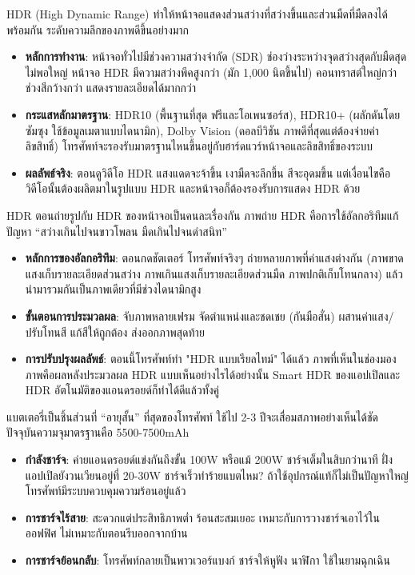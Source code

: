 
HDR (High Dynamic Range) ทำให้หน้าจอแสดงส่วนสว่างที่สว่างขึ้นและส่วนมืดที่มืดลงได้พร้อมกัน ระดับความลึกของภาพดีขึ้นอย่างมาก

\begin{itemize}
  \item \textbf{หลักการทำงาน}: หน้าจอทั่วไปมีช่วงความสว่างจำกัด (SDR) ช่องว่างระหว่างจุดสว่างสุดกับมืดสุดไม่พอใหญ่ หน้าจอ HDR มีความสว่างพีคสูงกว่า (มัก 1,000 นิตขึ้นไป) คอนทราสต์ใหญ่กว่า ช่วงสีกว้างกว่า แสดงรายละเอียดได้มากกว่า
  \item \textbf{กระแสหลักมาตรฐาน}: HDR10 (พื้นฐานที่สุด ฟรีและโอเพนซอร์ส), HDR10+ (ผลักดันโดยซัมซุง ใช้ข้อมูลเมตาแบบไดนามิก), Dolby Vision (ดอลบีวิชัน ภาพดีที่สุดแต่ต้องจ่ายค่าลิขสิทธิ์) โทรศัพท์จะรองรับมาตรฐานไหนขึ้นอยู่กับฮาร์ดแวร์หน้าจอและลิขสิทธิ์ของระบบ
  \item \textbf{ผลลัพธ์จริง}: ตอนดูวิดีโอ HDR แสงแดดจะจ้าขึ้น เงามืดจะลึกขึ้น สีจะอุดมขึ้น แต่เงื่อนไขคือวิดีโอนั้นต้องผลิตมาในรูปแบบ HDR และหน้าจอก็ต้องรองรับการแสดง HDR ด้วย
\end{itemize}


HDR ตอนถ่ายรูปกับ HDR ของหน้าจอเป็นคนละเรื่องกัน ภาพถ่าย HDR คือการใช้อัลกอริทึมแก้ปัญหา “สว่างเกินไปจนขาวโพลน มืดเกินไปจนดำสนิท”

\begin{itemize}
  \item \textbf{หลักการของอัลกอริทึม}: ตอนกดชัตเตอร์ โทรศัพท์จริงๆ ถ่ายหลายภาพที่ค่าแสงต่างกัน (ภาพขาดแสงเก็บรายละเอียดส่วนสว่าง ภาพเกินแสงเก็บรายละเอียดส่วนมืด ภาพปกติเก็บโทนกลาง) แล้วนำมารวมกันเป็นภาพเดียวที่มีช่วงไดนามิกสูง
  \item \textbf{ขั้นตอนการประมวลผล}: จับภาพหลายเฟรม จัดตำแหน่งและชดเชย (กันมือสั่น) ผสานค่าแสง/ปรับโทนสี แก้สีให้ถูกต้อง ส่งออกภาพสุดท้าย
  \item \textbf{การปรับปรุงผลลัพธ์}: ตอนนี้โทรศัพท์ทำ "HDR แบบเรียลไทม์" ได้แล้ว ภาพที่เห็นในช่องมองภาพคือผลหลังประมวลผล HDR แบบเห็นอย่างไรได้อย่างนั้น Smart HDR ของแอปเปิลและ HDR อัตโนมัติของแอนดรอยด์ก็ทำได้ดีแล้วทั้งคู่
\end{itemize}


แบตเตอรี่เป็นชิ้นส่วนที่ “อายุสั้น” ที่สุดของโทรศัพท์ ใช้ไป 2-3 ปีจะเสื่อมสภาพอย่างเห็นได้ชัด ปัจจุบันความจุมาตรฐานคือ 5500-7500mAh

\begin{itemize}
  \item \textbf{กำลังชาร์จ}: ค่ายแอนดรอยด์แข่งกันถึงขั้น 100W หรือแม้ 200W ชาร์จเต็มในสิบกว่านาที ฝั่งแอปเปิลยังวนเวียนอยู่ที่ 20-30W ชาร์จเร็วทำร้ายแบตไหม? ถ้าใช้อุปกรณ์แท้ก็ไม่เป็นปัญหาใหญ่ โทรศัพท์มีระบบควบคุมความร้อนอยู่แล้ว
  \item \textbf{การชาร์จไร้สาย}: สะดวกแต่ประสิทธิภาพต่ำ ร้อนสะสมเยอะ เหมาะกับการวางชาร์จเอาไว้ในออฟฟิศ ไม่เหมาะกับตอนรีบออกจากบ้าน
  \item \textbf{การชาร์จย้อนกลับ}: โทรศัพท์กลายเป็นพาวเวอร์แบงก์ ชาร์จให้หูฟัง นาฬิกา ใช้ในยามฉุกเฉิน
\end{itemize}

